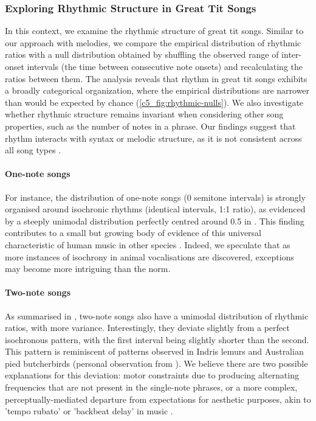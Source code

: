 \subsubsection{Exploring Rhythmic Structure in Great Tit Songs}

In this context, we examine the rhythmic structure of great tit songs. Similar to our approach with melodies, we compare the empirical distribution of rhythmic ratios with a null distribution obtained by shuffling the observed range of inter-onset intervals (the time between consecutive note onsets) and recalculating the ratios between them. The analysis reveals that rhythm in great tit songs exhibits a broadly categorical organization, where the empirical distributions are narrower than would be expected by chance (\autoref{c5_fig:rhythmic-nulls}). We also investigate whether rhythmic structure remains invariant when considering other song properties, such as the number of notes in a phrase. Our findings suggest that rhythm interacts with syntax or melodic structure, as it is not consistent across all song types \autocite{xing2022}.

\paragraph{One-note songs}
For instance, the distribution of one-note songs (0 semitone intervals) is strongly organised around isochronic rhythms (identical intervals, 1:1 ratio), as evidenced by a steeply unimodal distribution perfectly centred around 0.5 in . This finding contributes to a small but growing body of evidence of this universal characteristic of human music in other species \autocite{xing2022, rouse2021, roeske2020, demartsev2023, degregorio2021, degregorio2023, raimondi2023}. Indeed, we speculate that as more instances of isochrony in animal vocalisations are discovered, exceptions may become more intriguing than the norm.

\paragraph{Two-note songs}
As summarised in , two-note songs also have a unimodal distribution of rhythmic ratios, with more variance. Interestingly, they deviate slightly from a perfect isochronous pattern, with the first interval being slightly shorter than the second. This pattern is reminiscent of patterns observed in Indris lemurs \autocite{degregorio2021} and Australian pied butcherbirds (personal observation from \cite{xing2022}). We believe there are two possible explanations for this deviation: motor constraints due to producing alternating frequencies that are not present in the single-note phrases, or a more complex, perceptually-mediated departure from expectations for aesthetic purposes, akin to 'tempo rubato' \autocite{parncutt1994, degregorio2021} or 'backbeat delay' in music \autocite{frane2017}.

